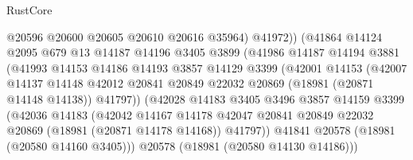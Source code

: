 \begin{lexlean}{RustCore}
\begin{coremodule}
                                @20596
                                @20600
                                @20605
                                @20610
                                @20616
                                @35964)
                              @41972))
                          (@41864
                            @14124
                            @2095
                            @679
                            @13
                            @14187
                            @14196
                            @3405
                            @3899
                            (@41986
                              @14187
                              @14194
                              @3881
                              (@41993
                                @14153
                                @14186
                                @14193
                                @3857
                                @14129
                                @3399
                                (@42001
                                  @14153
                                  (@42007
                                    @14137
                                    @14148
                                    @42012
                                    @20841
                                    @20849
                                    @22032
                                    @20869
                                    (@18981 (@20871 @14148 @14138))
                                    @41797))
                                (@42028
                                  @14183
                                  @3405
                                  @3496
                                  @3857
                                  @14159
                                  @3399
                                  (@42036
                                    @14183
                                    (@42042
                                      @14167
                                      @14178
                                      @42047
                                      @20841
                                      @20849
                                      @22032
                                      @20869
                                      (@18981 (@20871 @14178 @14168))
                                      @41797))
                                  @41841
                                  @20578
                                  (@18981 (@20580 @14160 @3405)))
                                @20578
                                (@18981 (@20580 @14130 @14186)))

\end{coremodule}
\end{lexlean}
